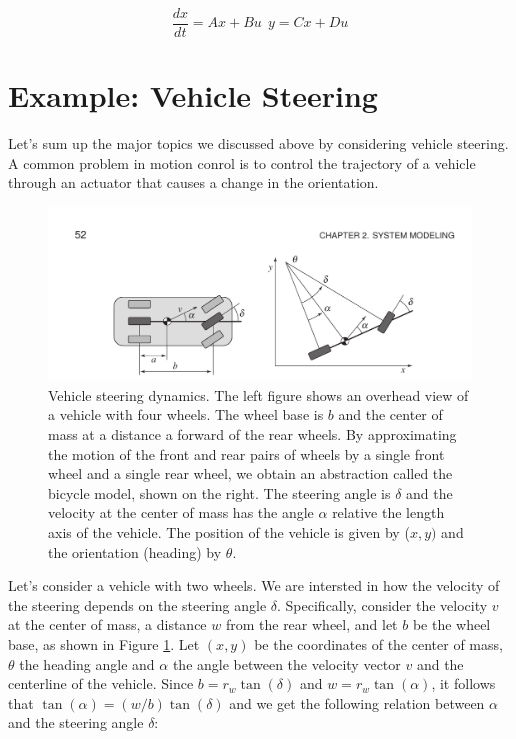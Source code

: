 \begin{equation}
\frac{dx}{dt} = Ax + Bu ~~ y = Cx + Du
\end{equation}


\section{Example: Vehicle Steering}

Let's sum up the major topics we discussed above by considering vehicle steering. A common problem in motion conrol is to control
the trajectory of a vehicle through an actuator that causes a change in the orientation. 


\begin{figure}[!htb]
\begin{center}
\includegraphics[scale=0.280]{img/state_feedback/vehicle_steering.jpeg}
\end{center}
\caption{Vehicle steering dynamics. The left figure shows an overhead view of a vehicle
with four wheels. The wheel base is $b$ and the center of mass at a distance a forward of the
rear wheels. By approximating the motion of the front and rear pairs of wheels by a single
front wheel and a single rear wheel, we obtain an abstraction called the bicycle model, shown
on the right. The steering angle is $\delta$ and the velocity at the center of mass has the angle $\alpha$
relative the length axis of the vehicle. The position of the vehicle is given by ($x, y)$ and the orientation (heading) by $\theta$.}
\label{vehicle_steering}
\end{figure}

Let's consider a vehicle with two wheels. We are intersted in how the velocity of the steering depends on the steering angle $\delta$.
Specifically, consider the velocity $v$ at the center
of mass, a distance $w$ from the rear wheel, and let $b$ be the wheel base, as shown
in Figure \ref{vehicle_steering}. Let $(x, y)$ be the coordinates of the center of mass, $\theta$ the heading
angle and $\alpha$ the angle between the velocity vector $v$ and the centerline of the vehicle.
Since $b = r_w\tan(\delta)$ and $w = r_w\tan(\alpha)$, it follows that $\tan(\alpha) = (w/b) \tan(\delta)$ and we get
the following relation between $\alpha$ and the steering angle $\delta$:

